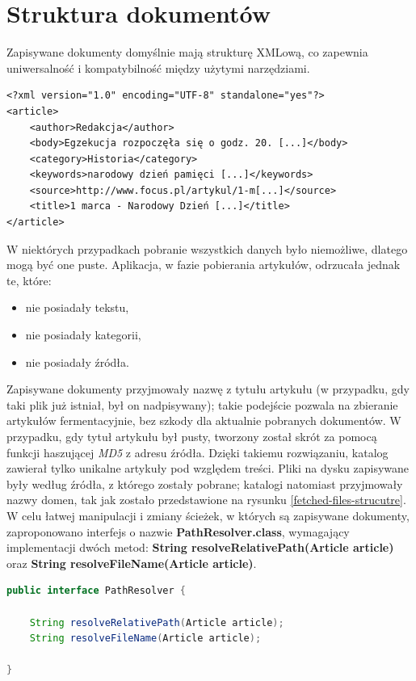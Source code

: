 \section{Struktura dokumentów}

Zapisywane dokumenty domyślnie mają strukturę XMLową, co zapewnia uniwersalność i kompatybilność między użytymi narzędziami. 
\lstset{language=XML}
\begin{lstlisting}
<?xml version="1.0" encoding="UTF-8" standalone="yes"?>
<article>
    <author>Redakcja</author>
    <body>Egzekucja rozpoczęła się o godz. 20. [...]</body>
    <category>Historia</category>
    <keywords>narodowy dzień pamięci [...]</keywords>
    <source>http://www.focus.pl/artykul/1-m[...]</source>
    <title>1 marca - Narodowy Dzień [...]</title>
</article>
\end{lstlisting}
W niektórych przypadkach pobranie wszystkich danych było niemożliwe, dlatego mogą być one puste. Aplikacja, w fazie pobierania artykułów, odrzucała jednak te, które:
\begin{itemize}
\setlength\itemsep{0.6em}
\item nie posiadały tekstu,
\item nie posiadały kategorii,
\item nie posiadały źródła.
\end{itemize}
Zapisywane dokumenty przyjmowały nazwę z tytułu artykułu (w przypadku, gdy taki plik już istniał, był on nadpisywany); takie podejście pozwala na zbieranie artykułów fermentacyjnie, bez szkody dla aktualnie pobranych dokumentów. W przypadku, gdy tytuł artykułu był pusty, tworzony został skrót za pomocą funkcji haszującej \textit{MD5} \cite{md5-hash} z adresu źródła. Dzięki takiemu rozwiązaniu, katalog zawierał tylko unikalne artykuły pod względem treści. Pliki na dysku zapisywane były według źródła, z którego zostały pobrane; katalogi natomiast przyjmowały nazwy domen, tak jak zostało przedstawione na rysunku \ref{fetched-files-strucutre}. W celu łatwej manipulacji i zmiany ścieżek, w których są zapisywane dokumenty, zaproponowano interfejs o nazwie \textbf{PathResolver.class}, wymagający implementacji dwóch metod: \textbf{String resolveRelativePath(Article article)} oraz \textbf{String resolveFileName(Article article)}. 

\begin{lstlisting}[language=Java,basicstyle=\small, style=javaStyle]
public interface PathResolver {

	String resolveRelativePath(Article article);
	String resolveFileName(Article article);
    
}
\end{lstlisting}

